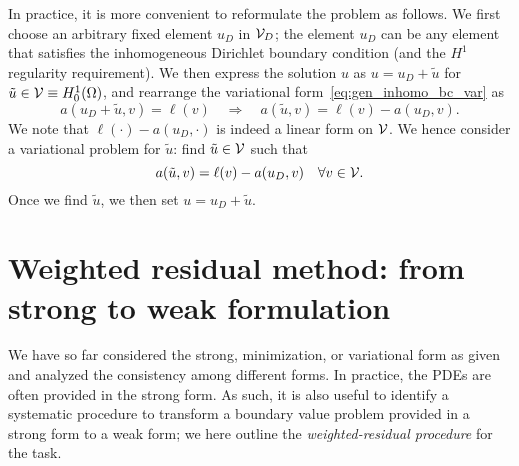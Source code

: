 In practice, it is more convenient to reformulate the problem as follows.  We first choose an arbitrary fixed element $u_D$ in $\mathcal{V}_D$; the element $u_D$ can be any element that satisfies the inhomogeneous Dirichlet boundary condition (and the $H^1$ regularity requirement). We then express the solution $u$ as $u = u_D + \tilde u$ for $\tilde u \in \mathcal{V} \equiv H^1_0(\Omega)$, and rearrange the variational form~\eqref{eq:gen_inhomo_bc_var} as
\begin{equation*}
  a(u_D + \tilde u,v) = \ell(v) \quad \Rightarrow \quad
  a(\tilde u,v) = \ell(v) - a(u_D,v).
\end{equation*}
We note that $\ell(\cdot) - a(u_D,\cdot)$ is indeed a linear form on $\mathcal{V}$. We hence consider a variational problem for $\tilde u$: find $\tilde u \in \mathcal{V}$ such that
\begin{equation*}
  a(\tilde u,v) = \ell(v) - a(u_D,v) \quad \forall v \in \mathcal{V}.
\end{equation*}
Once we find $\tilde u$, we then set $u = u_D + \tilde u$.

\section{Weighted residual method: from strong to weak formulation}
We have so far considered the strong, minimization, or variational form as given and analyzed the consistency among different forms.  In practice, the PDEs are often provided in the strong form. As such, it is also useful to identify a systematic procedure to transform a boundary value problem provided in a strong form to a weak form; we here outline the \emph{weighted-residual procedure} for the task.



